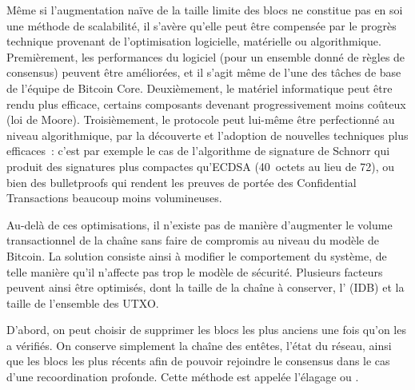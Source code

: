 Même si l'augmentation naïve de la taille limite des blocs ne constitue pas en soi une méthode de scalabilité, il s'avère qu'elle peut être compensée par le progrès technique provenant de l'optimisation logicielle, matérielle ou algorithmique. Premièrement, les performances du logiciel (pour un ensemble donné de règles de consensus) peuvent être améliorées, et il s'agit même de l'une des tâches de base de l'équipe de Bitcoin Core. Deuxièmement, le matériel informatique peut être rendu plus efficace, certains composants devenant progressivement moins coûteux (loi de Moore). Troisièmement, le protocole peut lui-même être perfectionné au niveau algorithmique, par la découverte et l'adoption de nouvelles techniques plus efficaces~: c'est par exemple le cas de l'algorithme de signature de Schnorr qui produit des signatures plus compactes qu'ECDSA (40~octets au lieu de 72), ou bien des bulletproofs qui rendent les preuves de portée des Confidential Transactions beaucoup moins volumineuses.

Au-delà de ces optimisations, il n'existe pas de manière d'augmenter le volume transactionnel de la chaîne sans faire de compromis au niveau du modèle de Bitcoin. La solution consiste ainsi à modifier le comportement du système, de telle manière qu'il n'affecte pas trop le modèle de sécurité. Plusieurs facteurs peuvent ainsi être optimisés, dont la taille de la chaîne à conserver, l' (IDB) et la taille de l'ensemble des UTXO.

D'abord, on peut choisir de supprimer les blocs les plus anciens une fois qu'on les a vérifiés. On conserve simplement la chaîne des entêtes, l'état du réseau, ainsi que les blocs les plus récents afin de pouvoir rejoindre le consensus dans le cas d'une recoordination profonde. Cette méthode est appelée l'élagage ou .

